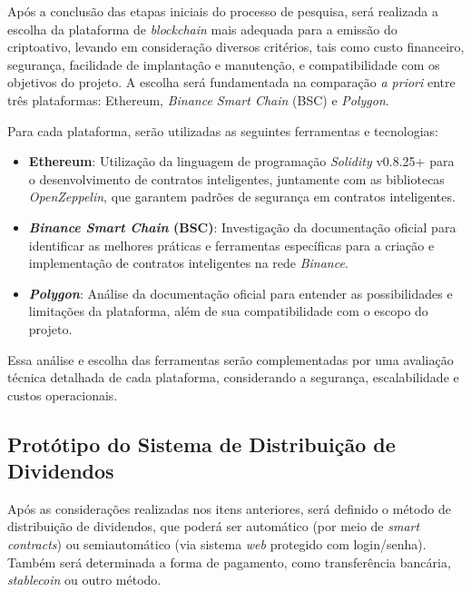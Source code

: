 \documentclass[12pt, a4paper, oneside, openright, chapter=TITLE]{abntex2}
\begin{document}
\hspace*{\parindent} Após a conclusão das etapas iniciais do processo de pesquisa, será realizada a escolha da plataforma de \textit{blockchain} mais adequada para a emissão do criptoativo, levando em consideração diversos critérios, tais como custo financeiro, segurança, facilidade de implantação e manutenção, e compatibilidade com os objetivos do projeto. A escolha será fundamentada na comparação \textit{a priori} entre três plataformas: Ethereum, \textit{Binance Smart Chain} (BSC) e \textit{Polygon}.

Para cada plataforma, serão utilizadas as seguintes ferramentas e tecnologias:

\begin{itemize}
    \item \textbf{Ethereum}: Utilização da linguagem de programação \textit{Solidity} v0.8.25+ para o desenvolvimento de contratos inteligentes, juntamente com as bibliotecas \textit{OpenZeppelin}, que garantem padrões de segurança em contratos inteligentes.
    \item \textbf{\textit{Binance Smart Chain} (BSC)}: Investigação da documentação oficial para identificar as melhores práticas e ferramentas específicas para a criação e implementação de contratos inteligentes na rede \textit{Binance}.
    \item \textbf{\textit{Polygon}}: Análise da documentação oficial para entender as possibilidades e limitações da plataforma, além de sua compatibilidade com o escopo do projeto.
\end{itemize}

Essa análise e escolha das ferramentas serão complementadas por uma avaliação técnica detalhada de cada plataforma, considerando a segurança, escalabilidade e custos operacionais.

\subsection{Protótipo do Sistema de Distribuição de Dividendos}

\hspace*{\parindent} Após as considerações realizadas nos itens anteriores, será definido o método de distribuição de dividendos, que poderá ser automático (por meio de \textit{smart contracts}) ou semiautomático (via sistema \textit{web} protegido com login/senha). Também será determinada a forma de pagamento, como transferência bancária, \textit{stablecoin} ou outro método.
\end{document}
